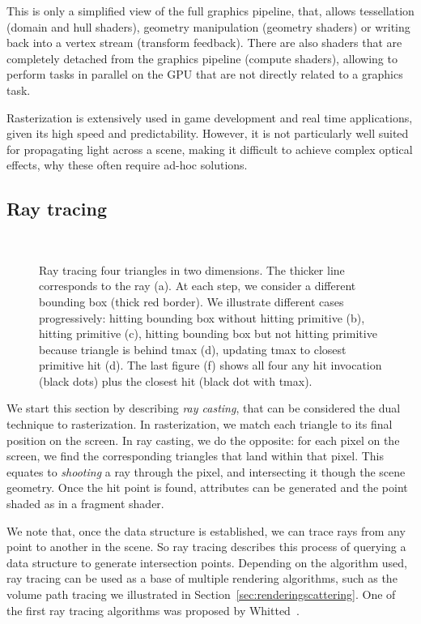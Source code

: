 This is only a simplified view of the full graphics pipeline, that, allows tessellation (domain and hull shaders), geometry manipulation (geometry shaders) or writing back into a vertex stream (transform feedback). There are also shaders that are completely detached from the graphics pipeline (compute shaders), allowing to perform tasks in parallel on the GPU that are not directly related to a graphics task. 

Rasterization is extensively used in game development and real time applications, given its high speed and predictability. However, it is not particularly well suited for propagating light across a scene, making it difficult to achieve complex optical effects, why these often require ad-hoc solutions.

\subsection{Ray tracing}

\begin{figure}
\centering
   \def\svgwidth{\textwidth}
    \\
\caption{Ray tracing four triangles in two dimensions. The thicker line corresponds to the ray (a). At each step, we consider a different bounding box (thick red border). We illustrate different cases progressively: hitting bounding box without hitting primitive (b), hitting primitive (c), hitting bounding box but not hitting primitive because triangle is behind tmax (d), updating tmax to closest primitive hit (d). The last figure (f) shows all four any hit invocation (black dots) plus the closest hit (black dot with tmax).} 
\label{fig:ray_tracing}
\end{figure}

We start this section by describing \emph{ray casting}, that can be considered the dual technique to rasterization. In rasterization, we match each triangle to its final position on the screen. In ray casting, we do the opposite: for each pixel on the screen, we find the corresponding triangles that land within that pixel. This equates to \emph{shooting} a ray through the pixel, and intersecting it though the scene geometry. Once the hit point is found, attributes can be generated and the point shaded as in a fragment shader. 

We note that, once the data structure is established, we can trace rays from any point to another in the scene. So ray tracing describes this process of querying a data structure to generate intersection points. Depending on the algorithm used, ray tracing can be used as a base of multiple rendering algorithms, such as the volume path tracing we illustrated in Section~\ref{sec:renderingscattering}. One of the first ray tracing algorithms was proposed by Whitted~\cite{Whitted1980}.

